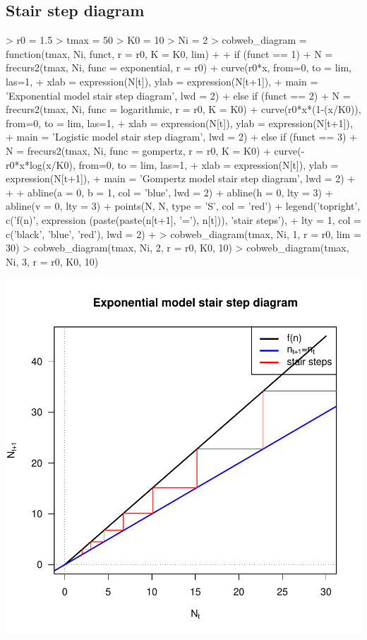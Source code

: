 \documentclass{article}
\begin{document}
\subsection{Stair step diagram}
\begin{Schunk}
\begin{Sinput}
> r0 = 1.5
> tmax = 50
> K0 = 10
> Ni = 2
> cobweb_diagram = function(tmax, Ni, funct, r = r0, K = K0, lim) {
+   
+   if (funct == 1) {
+       N = frecurs2(tmax, Ni, func = exponential, r = r0)
+       curve(r0*x, from=0, to = lim, las=1,
+         xlab = expression(N[t]), ylab = expression(N[t+1]), 
+         main = 'Exponential model stair step diagram', lwd = 2)
+   } else if (funct == 2) {
+       N = frecurs2(tmax, Ni, func = logarithmic, r = r0, K = K0)
+       curve(r0*x*(1-(x/K0)), from=0, to = lim, las=1,
+         xlab = expression(N[t]), ylab = expression(N[t+1]), 
+         main = 'Logistic model stair step diagram', lwd = 2)
+   } else if (funct == 3) {
+       N = frecurs2(tmax, Ni, func = gompertz, r = r0, K = K0)
+       curve(-r0*x*log(x/K0), from=0, to = lim, las=1,
+         xlab = expression(N[t]), ylab = expression(N[t+1]), 
+         main = 'Gompertz model stair step diagram', lwd = 2)
+   }
+   
+   abline(a = 0, b = 1, col = 'blue', lwd = 2)
+   abline(h = 0, lty = 3)
+   abline(v = 0, lty = 3)
+   points(N, N, type = 'S', col = 'red')
+   legend('topright', c('f(n)', expression (paste(paste(n[t+1], '='), n[t])), 'stair steps'), 
+        lty = 1, col = c('black', 'blue', 'red'), lwd = 2)
+ }
> cobweb_diagram(tmax, Ni, 1, r = r0, lim = 30)
> cobweb_diagram(tmax, Ni, 2, r = r0, K0, 10)
> cobweb_diagram(tmax, Ni, 3, r = r0, K0, 10)
\end{Sinput}
\end{Schunk}
\includegraphics{TP1-007}
\end{document}

